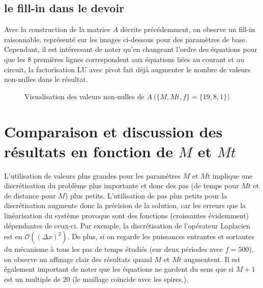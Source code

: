 \documentclass[11pt]{article}
\begin{document}
\subsection{le fill-in dans le devoir}

Avec la construction de la matrice $A$ décrite précédemment, on observe un fill-in raisonnable, représenté sur les images ci-dessous pour des paramètres de base. Cependant, il est intéressant de noter qu'en changeant l'ordre des équations pour que les 8 premières lignes correspondent aux équations liées au courant et au circuit, la factorisation LU avec pivot fait déjà augmenter le nombre de valeurs non-nulles dans le résultat.

\begin{figure}[H]
    \centering
    \qquad
    \caption{Visualisation des valeurs non-nulles de $A ~ \big(\{M, Mt, f\} = \{19, 8, 1\} \big) $ }
    \label{fig:example}
\end{figure}

\section{Comparaison et discussion des résultats en fonction de $M$ et $Mt$}

L'utilisation de valeurs plus grandes pour les paramètres $M$ et $Mt$ implique une discrétisation du problème plus importante et donc des pas (de temps pour $Mt$ et de distance pour $M$) plus petits. L'utilisation de pas plus petits pour la discrétisation augmente donc la précision de la solution, car les erreurs que la linéarisation du système provoque sont des fonctions (croissantes évidemment) dépendantes de ceux-ci. Par exemple, la discrétisation de l'opérateur Laplacien est en $\mathcal{O}((\Delta x)^2)$. De plus, si on regarde les puissances entrantes et sortantes du mécanisme à tous les pas de temps étudiés (sur deux périodes avec $f = 500$), on observe un affinage clair des résultats quand $M$ et $Mt$ augmentent. Il est également important de noter que les équations ne gardent du sens que si $M+1$ est un multiple de $20$ (le maillage coïncide avec les spires.).
\end{document}
